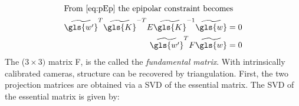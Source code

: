 \begin{align}
    \intertext{From~\eqref{eq:pEp} the epipolar constraint becomes}
    \widetilde{\gls{w'}} ^T \widetilde{\gls{K}}^{-T} E \widetilde{\gls{K}}^{-1} \widetilde{\gls{w}}  &= 0 \\
    \widetilde{\gls{w'}} ^T F \widetilde{\gls{w}}  &= 0
\end{align}
The (\(3\times3)\) matrix \gls{F}, is the called the \emph{fundamental matrix}.
With intrinsically calibrated cameras, structure can be recovered by triangulation.
First, the two projection matrices are obtained via a \gls{SVD} of the essential matrix.
The \gls{SVD} of the essential matrix is given by:

